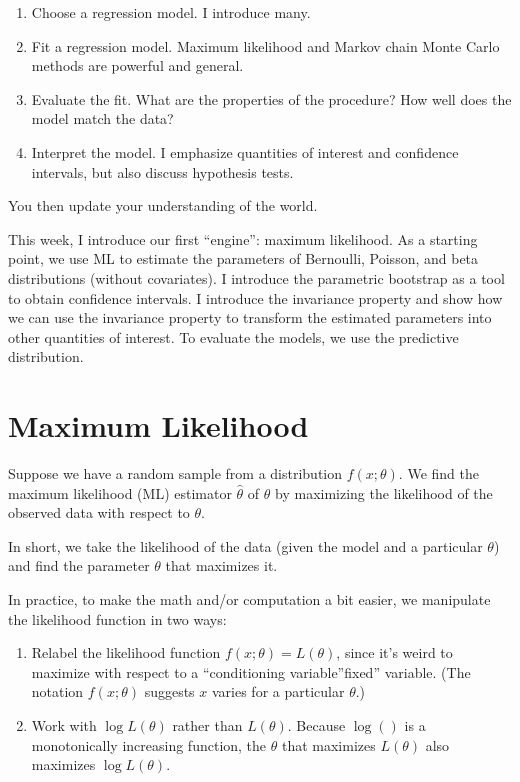 \documentclass[
]{book}
\providecommand{\tightlist}{%
  \setlength{\itemsep}{0pt}\setlength{\parskip}{0pt}}
\begin{document}
\begin{enumerate}
\def\labelenumi{\arabic{enumi}.}
\tightlist
\item
  Choose a regression model. I introduce many.
\item
  Fit a regression model. Maximum likelihood and Markov chain Monte
  Carlo methods are powerful and general.
\item
  Evaluate the fit. What are the properties of the procedure? How well
  does the model match the data?
\item
  Interpret the model. I emphasize quantities of interest and confidence
  intervals, but also discuss hypothesis tests.
\end{enumerate}

You then update your understanding of the world.

This week, I introduce our first ``engine'': maximum likelihood. As a
starting point, we use ML to estimate the parameters of Bernoulli,
Poisson, and beta distributions (without covariates). I introduce the
parametric bootstrap as a tool to obtain confidence intervals. I
introduce the invariance property and show how we can use the invariance
property to transform the estimated parameters into other quantities of
interest. To evaluate the models, we use the predictive distribution.

\hypertarget{maximum-likelihood}{%
\section{Maximum Likelihood}\label{maximum-likelihood}}

Suppose we have a random sample from a distribution \(f(x; \theta)\). We
find the maximum likelihood (ML) estimator \(\hat{\theta}\) of
\(\theta\) by maximizing the likelihood of the observed data with
respect to \(\theta\).

In short, we take the likelihood of the data (given the model and a
particular \(\theta\)) and find the parameter \(\theta\) that maximizes
it.

In practice, to make the math and/or computation a bit easier, we
manipulate the likelihood function in two ways:

\begin{enumerate}
\def\labelenumi{\arabic{enumi}.}
\tightlist
\item
  Relabel the likelihood function \(f(x; \theta) = L(\theta)\), since
  it's weird to maximize with respect to a ``conditioning
  variable''fixed'' variable. (The notation \(f(x; \theta)\) suggests
  \(x\) varies for a particular \(\theta\).)
\item
  Work with \(\log L(\theta)\) rather than \(L(\theta)\). Because
  \(\log()\) is a monotonically increasing function, the \(\theta\) that
  maximizes \(L(\theta)\) also maximizes \(\log L(\theta)\).
\end{enumerate}
\end{document}

